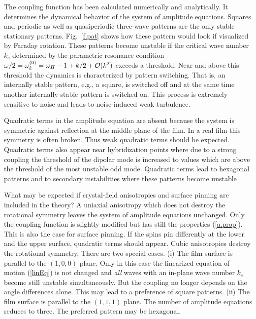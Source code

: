 The coupling function has been calculated numerically and
analytically. It determines the dynamical behavior of the system of
amplitude equations. Squares and periodic as well as quasiperiodic 
three-wave patterns are the only stable stationary patterns.
Fig.~\ref{f.pat} shows how these pattern would look if visualized by
Faraday rotation. These patterns become unstable if the critical wave
number $k_c$ determined by the parametric resonance condition
$\omega/2=\omega_k^{(0)}=\omega_H-1+k/2+{\cal O}(k^2)$ exceeds a
threshold. Near and above this threshold the dynamics is
characterized by pattern switching. That is, an internally stable
pattern, e.g., a square, is switched off and at the same time another
internally stable pattern is switched on. This process is extremely
sensitive to noise and leads to noise-induced weak turbulence. 

Quadratic terms in the amplitude equation are absent because the
system is symmetric against reflection at the middle plane of the
film. In a real film this symmetry is often broken.  Thus weak
quadratic terms should be expected. Quadratic terms also appear near
hybridization points where due to a strong coupling the threshold of
the dipolar mode is increased to values which are above the threshold
of the most unstable odd mode. Quadratic terms lead to hexagonal
patterns and to secondary instabilities where these patterns become
unstable \cite{cro.93}.

What may be expected if crystal-field anisotropies and surface
pinning are included in the theory? A uniaxial anisotropy which does 
not destroy the rotational symmetry leaves the system of amplitude 
equations unchanged. Only the coupling function is slightly modified
but has still the properties (\ref{a.prop}). This is also the case
for surface pinning. If the spins pin differently at the lower and
the upper surface, quadratic terms should appear. Cubic anisotropies
destroy the rotational symmetry.  There are two special cases. (i)
The film surface is parallel to the $(1,0,0)$ plane. Only in this
case the linearized equation of motion (\ref{linEq}) is not changed
and {\em all\/} waves with an in-plane wave number $k_c$ become still
unstable simultaneously. But the coupling no longer depends on the
angle differences alone. This may lead to a preference of square
patterns. (ii) The film surface is parallel to the $(1,1,1)$ plane.
The number of amplitude equations reduces to three. The preferred
pattern may be hexagonal.

